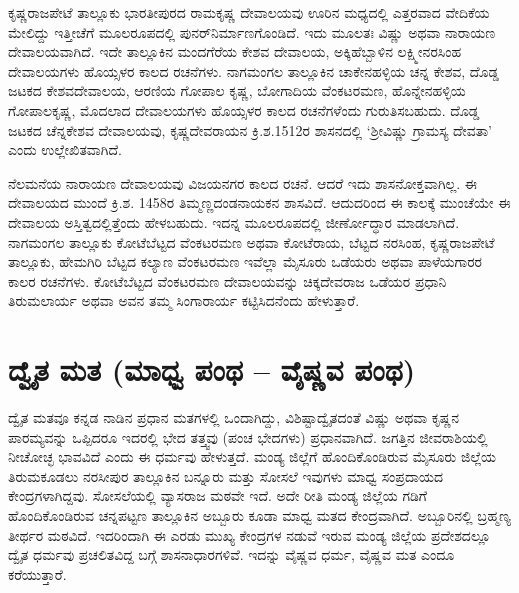 ಕೃಷ್ಣರಾಜಪೇಟೆ ತಾಲ್ಲೂಕು ಭಾರತೀಪುರದ ರಾಮಕೃಷ್ಣ ದೇವಾಲಯವು ಊರಿನ ಮಧ್ಯದಲ್ಲಿ ಎತ್ತರವಾದ ವೇದಿಕೆಯ ಮೇಲಿದ್ದು ಇತ್ತೀಚೆಗೆ ಮೂಲರೂಪದಲ್ಲಿ ಪುನರ್​ನಿರ್ಮಾಣಗೊಂಡಿದೆ. ಇದು ಮೂಲತಃ ವಿಷ್ಣು ಅಥವಾ ನಾರಾಯಣ ದೇವಾಲಯವಾಗಿದೆ. ಇದೇ ತಾಲ್ಲೂಕಿನ ಮಂದಗೆರೆಯ ಕೇಶವ ದೇವಾಲಯ, ಅಕ್ಕಿಹೆಬ್ಬಾಳಿನ ಲಕ್ಷ್ಮೀನರಸಿಂಹ ದೇವಾಲಯಗಳು ಹೊಯ್ಸಳರ ಕಾಲದ ರಚನೆಗಳು. ನಾಗಮಂಗಲ ತಾಲ್ಲೂಕಿನ ಚಾಕೇನಹಳ್ಳಿಯ ಚನ್ನ ಕೇಶವ, ದೊಡ್ಡ ಜಟಕದ ಕೇಶವದೇವಾಲಯ, ಆರಣಿಯ ಗೋಪಾಲ ಕೃಷ್ಣ, ಬೋಗಾದಿಯ ವೆಂಕಟರಮಣ, ಹೊನ್ನೇನಹಳ್ಳಿಯ ಗೋಪಾಲಕೃಷ್ಣ, ಮೊದಲಾದ ದೇವಾಲಯಗಳು ಹೊಯ್ಸಳರ ಕಾಲದ ರಚನೆಗಳೆಂದು ಗುರುತಿಸಬಹುದು. ದೊಡ್ಡ ಜಟಕದ ಚೆನ್ನಕೇಶವ ದೇವಾಲಯವು, ಕೃಷ್ಣದೇವರಾಯನ ಕ್ರಿ.ಶ.1512ರ ಶಾಸನದಲ್ಲಿ ‘ಶ‍್ರೀವಿಷ್ಣು ಗ್ರಾಮಸ್ಯ ದೇವತಾ’ ಎಂದು ಉಲ್ಲೇಖಿತವಾಗಿದೆ.

ನೆಲಮನೆಯ ನಾರಾಯಣ ದೇವಾಲಯವು ವಿಜಯನಗರ ಕಾಲದ ರಚನೆ. ಆದರೆ ಇದು ಶಾಸನೋಕ್ತವಾಗಿಲ್ಲ. ಈ ದೇವಾಲಯದ ಮುಂದೆ ಕ್ರಿ.ಶ. 1458ರ ತಿಮ್ಮಣ್ಣದಂಡನಾಯಕನ ಶಾಸವಿದೆ. ಆದುದರಿಂದ ಈ ಕಾಲಕ್ಕೆ ಮುಂಚೆಯೇ ಈ ದೇವಾಲಯ ಅಸ್ತಿತ್ವದಲ್ಲಿತ್ತೆಂದು ಹೇಳಬಹುದು. ಇದನ್ನ ಮೂಲರೂಪದಲ್ಲಿ ಜೀರ್ಣೋದ್ಧಾರ ಮಾಡಲಾಗಿದೆ. ನಾಗಮಂಗಲ ತಾಲ್ಲೂಕು ಕೋಟೆಬೆಟ್ಟದ ವೆಂಕಟರಮಣ ಅಥವಾ ಕೋಟೆರಾಯ, ಬೆಟ್ಟದ ನರಸಿಂಹ, ಕೃಷ್ಣರಾಜಪೇಟೆ ತಾಲ್ಲೂಕು, ಹೇಮಗಿರಿ ಬೆಟ್ಟದ ಕಲ್ಯಾಣ ವೆಂಕಟರಮಣ ಇವೆಲ್ಲಾ ಮೈಸೂರು ಒಡೆಯರು ಅಥವಾ ಪಾಳೆಯಗಾರರ ಕಾಲರ ರಚನೆಗಳು. ಕೋಟೆಬೆಟ್ಟದ ವೆಂಕಟರಮಣ ದೇವಾಲಯವನ್ನು ಚಿಕ್ಕದೇವರಾಜ ಒಡೆಯರ ಪ್ರಧಾನಿ ತಿರುಮಲಾರ್ಯ ಅಥವಾ ಅವನ ತಮ್ಮ ಸಿಂಗಾರಾರ್ಯ ಕಟ್ಟಿಸಿದನೆಂದು ಹೇಳುತ್ತಾರೆ.


\section*{ದ್ವೈತ ಮತ (ಮಾಧ್ವ ಪಂಥ – ವೈಷ್ಣವ ಪಂಥ)}

ದ್ವೈತ ಮತವೂ ಕನ್ನಡ ನಾಡಿನ ಪ್ರಧಾನ ಮತಗಳಲ್ಲಿ ಒಂದಾಗಿದ್ದು, ವಿಶಿಷ್ಟಾದ್ವೈತದಂತೆ ವಿಷ್ಣು ಅಥವಾ ಕೃಷ್ಣನ ಪಾರಮ್ಯವನ್ನು ಒಪ್ಪಿದರೂ ಇದರಲ್ಲಿ ಭೇದ ತತ್ತ್ವವು (ಪಂಚ ಭೇದಗಳು) ಪ್ರಧಾನವಾಗಿದೆ. ಜಗತ್ತಿನ ಜೀವರಾಶಿಯಲ್ಲಿ ನೀಚೋಚ್ಛ ಭಾವವಿದೆ ಎಂದು ಈ ಧರ್ಮವು ಹೇಳುತ್ತದೆ. ಮಂಡ್ಯ ಜಿಲ್ಲೆಗೆ ಹೊಂದಿಕೊಂಡಿರುವ ಮೈಸೂರು ಜಿಲ್ಲೆಯ ತಿರುಮಕೂಡಲು ನರಸೀಪುರ ತಾಲ್ಲೂಕಿನ ಬನ್ನೂರು ಮತ್ತು ಸೋಸಲೆ ಇವುಗಳು ಮಾಧ್ವ ಸಂಪ್ರದಾಯದ ಕೇಂದ್ರಗಳಾಗಿದ್ದವು. ಸೋಸಲೆಯಲ್ಲಿ ವ್ಯಾಸರಾಜ ಮಠವೇ ಇದೆ. ಅದೇ ರೀತಿ ಮಂಡ್ಯ ಜಿಲ್ಲೆಯ ಗಡಿಗೆ ಹೊಂದಿಕೊಂಡಿರುವ ಚನ್ನಪಟ್ಟಣ ತಾಲ್ಲೂಕಿನ ಅಬ್ಬೂರು ಕೂಡಾ ಮಾಧ್ವ ಮತದ ಕೇಂದ್ರವಾಗಿದೆ. ಅಬ್ಬೂರಿನಲ್ಲಿ ಬ್ರಹ್ಮಣ್ಯ ತೀರ್ಥರ ಮಠವಿದೆ. ಇದರಿಂದಾಗಿ ಈ ಎರಡು ಮುಖ್ಯ ಕೇಂದ್ರಗಳ ನಡುವೆ ಇರುವ ಮಂಡ್ಯ ಜಿಲ್ಲೆಯ ಪ್ರದೇಶದಲ್ಲೂ ದ್ವೈತ ಧರ್ಮವು ಪ್ರಚಲಿತವಿದ್ದ ಬಗ್ಗೆ ಶಾಸನಾಧಾರಗಳಿವೆ. ಇದನ್ನು ವೈಷ್ಣವ ಧರ್ಮ, ವೈಷ್ಣವ ಮತ ಎಂದೂ ಕರೆಯುತ್ತಾರೆ.

